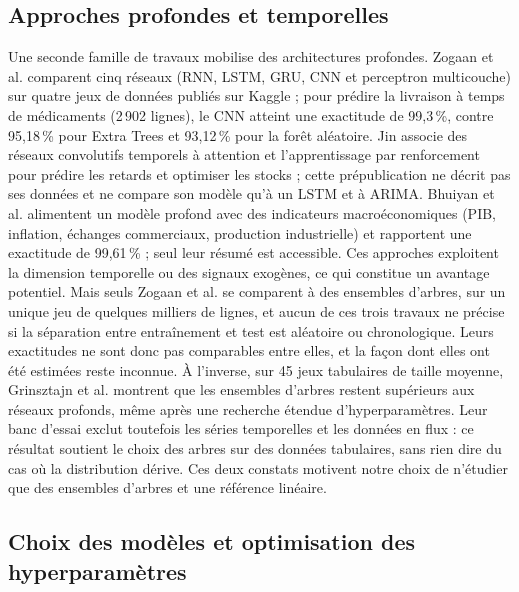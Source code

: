 \documentclass[11pt,a4paper]{article}
\theoremstyle{definition}
\begin{document}
\subsection{Approches profondes et temporelles}
\label{sec:rw-profond}

Une seconde famille de travaux mobilise des architectures profondes. Zogaan et al. \cite{zogaan2025leveraging} comparent cinq réseaux (RNN, LSTM, GRU, CNN et perceptron multicouche) sur quatre jeux de données publiés sur Kaggle ; pour prédire la livraison à temps de médicaments (2\,902 lignes), le CNN atteint une exactitude de 99,3\,\%, contre 95,18\,\% pour Extra Trees et 93,12\,\% pour la forêt aléatoire. Jin \cite{jin2025attention} associe des réseaux convolutifs temporels à attention et l'apprentissage par renforcement pour prédire les retards et optimiser les stocks ; cette prépublication ne décrit pas ses données et ne compare son modèle qu'à un LSTM et à ARIMA. Bhuiyan et al. \cite{bhuiyan2026deep} alimentent un modèle profond avec des indicateurs macroéconomiques (PIB, inflation, échanges commerciaux, production industrielle) et rapportent une exactitude de 99,61\,\% ; seul leur résumé est accessible. Ces approches exploitent la dimension temporelle ou des signaux exogènes, ce qui constitue un avantage potentiel. Mais seuls Zogaan et al. se comparent à des ensembles d'arbres, sur un unique jeu de quelques milliers de lignes, et aucun de ces trois travaux ne précise si la séparation entre entraînement et test est aléatoire ou chronologique. Leurs exactitudes ne sont donc pas comparables entre elles, et la façon dont elles ont été estimées reste inconnue. À l'inverse, sur 45 jeux tabulaires de taille moyenne, Grinsztajn et al. \cite{grinsztajn2022tree} montrent que les ensembles d'arbres restent supérieurs aux réseaux profonds, même après une recherche étendue d'hyperparamètres. Leur banc d'essai exclut toutefois les séries temporelles et les données en flux : ce résultat soutient le choix des arbres sur des données tabulaires, sans rien dire du cas où la distribution dérive. Ces deux constats motivent notre choix de n'étudier que des ensembles d'arbres et une référence linéaire.

\subsection{Choix des modèles et optimisation des hyperparamètres}
\label{sec:rw-hpo}
\end{document}

